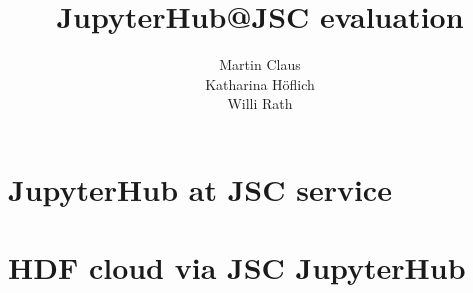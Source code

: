 \documentclass[11pt,a4paper]{article}
\title{\textbf{JupyterHub@JSC evaluation}}
\author{
  Martin Claus \\ %
	Katharina Höflich \\
	Willi Rath}
\begin{document}
\maketitle


\tableofcontents


%





\section{JupyterHub at JSC service}














\section{HDF cloud via JSC JupyterHub}
\label{s-hdfcloud-jsc-jhub}











\appendix





\end{document}
